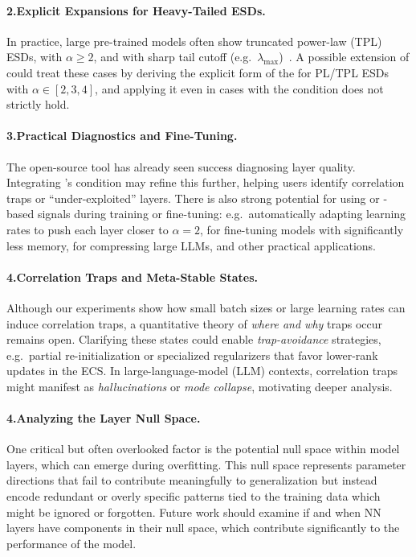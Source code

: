 \paragraph{2.\quad Explicit \RTransform Expansions for Heavy-Tailed  ESDs.}
In practice, large pre-trained models often show truncated power-law (TPL) ESDs, with $\alpha \ge 2$,
and with sharp tail cutoff  (e.g.\ $\lambda_{\max}$)~\cite{YTHx22_TR,YTHx23_KDD}.
A possible extension of \SETOL could treat these cases by deriving the explicit form
of the \RTransform for PL/TPL ESDs with $\alpha\in[2,3,4]$, and applying it even in
cases with the \TRACELOG condition does not strictly hold.

\paragraph{3.\quad Practical Diagnostics and Fine-Tuning.}
The open-source \WW tool has already seen success diagnosing layer quality. Integrating \SETOL’s 
\TRACELOG condition may refine this further, helping users identify correlation traps or “under-exploited” 
layers. There is also strong potential for using \ALPHA or \TRACELOG-based signals during training or 
fine-tuning: e.g.\ automatically adapting learning rates to push each layer closer to $\alpha=2$,
for fine-tuning models with significantly less memory\cite{Qing2024AlphaLoRA},
for compressing large LLMs\cite{alphapruning_NEURIPS2024}, and other practical applications.

\paragraph{4.\quad Correlation Traps and Meta-Stable States.}
Although our experiments show how small batch sizes or large learning rates can induce correlation traps, 
a quantitative theory of \emph{where and why} traps occur remains open. Clarifying these states could 
enable \emph{trap-avoidance} strategies, e.g.\ partial re-initialization or specialized regularizers that 
favor lower-rank updates in the ECS. In large-language-model (LLM) contexts, correlation traps might 
manifest as \emph{hallucinations} or \emph{mode collapse}, motivating deeper analysis.

\paragraph{4.\quad Analyzing the Layer Null Space.}
One critical but often overlooked factor is the potential null space within model layers, which can emerge during overfitting. This null space represents parameter directions that fail to contribute meaningfully to generalization but instead encode redundant or overly specific patterns tied to the training data which might be ignored or forgotten.
Future work should examine if and when NN layers have components in their null space,
which contribute significantly to the performance of the model.

